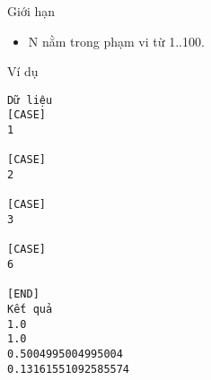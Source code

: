 Giới hạn
\begin{itemize}
	\item     N nằm trong phạm vi từ 1..100.   
\end{itemize}
Ví dụ
\begin{verbatim}
Dữ liệu
[CASE]
1

[CASE]
2

[CASE]
3

[CASE]
6

[END]
Kết quả
1.0
1.0
0.5004995004995004
0.13161551092585574
\end{verbatim}